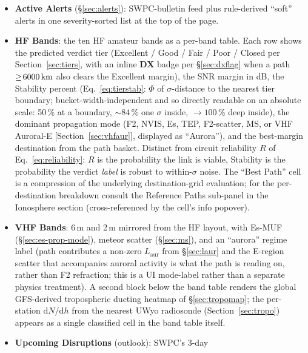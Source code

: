 \documentclass[11pt,a4paper]{article}
\newcommand{\SI}[2]{#1\,\text{#2}}
\newcommand{\km}{\text{km}}
\begin{document}
\begin{itemize}[nosep]
  \item \textbf{Active Alerts} (\S\ref{sec:alerts}): SWPC-bulletin
        feed plus rule-derived ``soft'' alerts in one
        severity-sorted list at the top of the page.
  \item \textbf{HF Bands}: the ten HF amateur bands as a per-band
        table.  Each row shows the predicted verdict tier
        (Excellent / Good / Fair / Poor / Closed per
        Section~\ref{sec:tiers}, with an inline \textbf{DX} badge
        per \S\ref{sec:dxflag} when a path $\geq\!\SI{6000}{\km}$
        also clears the Excellent margin), the SNR margin in dB,
        the Stability percent
        (Eq.~\ref{eq:tierstab}: $\Phi$ of $\sigma$-distance to the
        nearest tier boundary; bucket-width-independent and so
        directly readable on an absolute scale: 50\,\% at a
        boundary, ${\sim}84$\,\% one $\sigma$ inside, $\to 100$\,\%
        deep inside), the dominant propagation mode (F2, NVIS, Es,
        TEP, F2-scatter, MS, or VHF Auroral-E
        [Section~\ref{sec:vhfaur}], displayed as ``Aurora''), and
        the best-margin destination from the
        path basket.  Distinct from circuit reliability $R$ of
        Eq.~\ref{eq:reliability}: $R$ is the probability the link
        is viable, Stability is the probability the verdict
        \emph{label} is robust to within-$\sigma$ noise.  The
        ``Best Path'' cell is a compression of the underlying
        destination-grid evaluation; for the per-destination
        breakdown
        consult the Reference Paths sub-panel in the Ionosphere
        section (cross-referenced by the cell's info popover).
  \item \textbf{VHF Bands}: 6\,m and 2\,m mirrored from the HF
        layout, with Es-MUF (\S\ref{sec:es-prop-mode}), meteor
        scatter (\S\ref{sec:ms}), and an ``aurora'' regime label (path contributes a non-zero $L_{\text{aur}}$
        from \S\ref{sec:laur} and the E-region scatter that
        accompanies auroral activity is what the path is reading
        on, rather than F2 refraction; this is a UI mode-label
        rather than a separate physics treatment).  A second
        block below the band table renders the global GFS-derived
        tropospheric ducting heatmap of \S\ref{sec:tropomap}; the
        per-station $\mathrm{d}N/\mathrm{d}h$ from the nearest
        UWyo radiosonde (Section~\ref{sec:tropo}) appears as a
        single classified cell in the band table itself.
  \item \textbf{Upcoming Disruptions} (outlook): SWPC's 3-day

\end{itemize}
\end{document}
